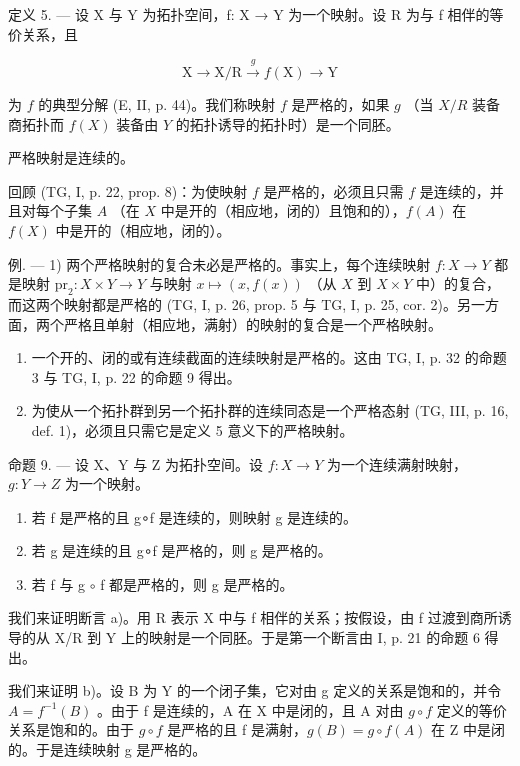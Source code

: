 定义 5. --- 设 X 与 Y 为拓扑空间，f: X → Y 为一个映射。设 R 为与 f 相伴的等价关系，且

\[
\mathrm{X} \rightarrow \mathrm{X} / \mathrm{R} \xrightarrow {g} f (\mathrm{X}) \rightarrow \mathrm{Y}
\]

为 \(f\) 的典型分解 (E, II, p. 44)。我们称映射 \(f\) 是严格的，如果 \(g\) （当 \(X/R\) 装备商拓扑而 \(f(X)\) 装备由 \(Y\) 的拓扑诱导的拓扑时）是一个同胚。

严格映射是连续的。

回顾 (TG, I, p. 22, prop. 8)：为使映射 \(f\) 是严格的，必须且只需 \(f\) 是连续的，并且对每个子集 \(A\) （在 \(X\) 中是开的（相应地，闭的）且饱和的），\(f(A)\) 在 \(f(X)\) 中是开的（相应地，闭的）。

例. --- 1) 两个严格映射的复合未必是严格的。事实上，每个连续映射 \(f \colon X \to Y\) 都是映射 \(\mathrm{pr}_2 \colon X \times Y \to Y\) 与映射 \(x \mapsto (x, f(x))\) （从 \(X\) 到 \(X \times Y\) 中）的复合，而这两个映射都是严格的 (TG, I, p. 26, prop. 5 与 TG, I, p. 25, cor. 2)。另一方面，两个严格且单射（相应地，满射）的映射的复合是一个严格映射。

\begin{enumerate}
\def\labelenumi{\arabic{enumi})}
\setcounter{enumi}{1}
\item
  一个开的、闭的或有连续截面的连续映射是严格的。这由 TG, I, p. 32 的命题 3 与 TG, I, p. 22 的命题 9 得出。
\item
为使从一个拓扑群到另一个拓扑群的连续同态是一个严格态射 (TG, III, p. 16, def. 1)，必须且只需它是定义 5 意义下的严格映射。
\end{enumerate}

命题 9. --- 设 X、Y 与 Z 为拓扑空间。设 \(f\colon X \to Y\) 为一个连续满射映射，\(g\colon Y \to Z\) 为一个映射。

\begin{enumerate}
\def\labelenumi{\alph{enumi})}
\item
若 f 是严格的且 g∘f 是连续的，则映射 g 是连续的。
\item
若 g 是连续的且 g∘f 是严格的，则 g 是严格的。
\item
若 f 与 g \(\circ\) f 都是严格的，则 g 是严格的。
\end{enumerate}

我们来证明断言 a)。用 R 表示 X 中与 f 相伴的关系；按假设，由 f 过渡到商所诱导的从 X/R 到 Y 上的映射是一个同胚。于是第一个断言由 I, p. 21 的命题 6 得出。

我们来证明 b)。设 B 为 Y 的一个闭子集，它对由 g 定义的关系是饱和的，并令 \(A = f^{-1}(B)\) 。由于 f 是连续的，A 在 X 中是闭的，且 A 对由 \(g \circ f\) 定义的等价关系是饱和的。由于 \(g \circ f\) 是严格的且 f 是满射，\(g(B) = g \circ f(A)\) 在 Z 中是闭的。于是连续映射 g 是严格的。

